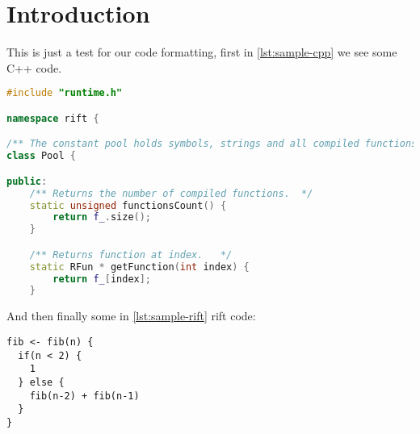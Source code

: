 \chapter*{Introduction}

This is just a test for our code formatting, first in \autoref{lst:sample-cpp} we see some C++ code.

\begin{lstlisting}[language=cpp, caption={A sample C++ snippet}, label={lst:sample-cpp}]
#include "runtime.h"

namespace rift {

/** The constant pool holds symbols, strings and all compiled functions.*/
class Pool {

public:
    /** Returns the number of compiled functions.  */
    static unsigned functionsCount() {
        return f_.size();
    }

    /** Returns function at index.   */
    static RFun * getFunction(int index) {
        return f_[index];
    }
\end{lstlisting}

And then finally some in \autoref{lst:sample-rift} rift code:

\begin{lstlisting}[language=rift, caption={A sample rift snippet}, label={lst:sample-rift}]
fib <- fib(n) {
  if(n < 2) {
    1
  } else {
    fib(n-2) + fib(n-1)
  }
}
\end{lstlisting}
